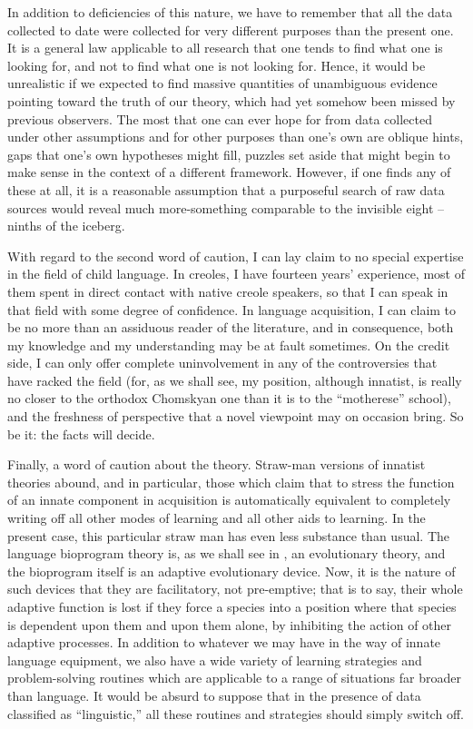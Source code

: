 In addition to deficiencies of this nature, we have to remember that all the data collected to date were collected for very different purposes than the present one. It is a general law applicable to all research that one tends to find what one is looking for, and not to find what one is not looking for. Hence, it would be unrealistic if we expected to find massive quantities of unambiguous evidence pointing toward the truth of our theory, which had yet somehow been missed by previous observers. The most that one can ever hope for from data collected under other assumptions and for other purposes than one's own are oblique hints, gaps that one's own hypotheses might fill, puzzles set aside that might begin to make sense in the context of a different framework. However, if one finds any of these at all, it is a reasonable assumption that a purposeful search of raw data sources would reveal much more-something comparable to the invisible eight -- ninths of the iceberg.

With regard to the second word of caution, I can lay claim to no special expertise in the field of child language. In creoles, I have fourteen years' experience, most of them spent in direct contact with native creole speakers, so that I can speak in that field with some degree of confidence. In language acquisition, I can claim to be no more than an assiduous reader of the literature, and in consequence, both my knowledge and my understanding may be at fault sometimes. On the credit side, I can only offer complete uninvolvement in any of the controversies that have racked the field (for, as we shall see, my position, although innatist, is really no closer to the orthodox Chomskyan one than it is to the ``motherese'' school), and the freshness of perspective that a novel viewpoint may on occasion bring. So be it: the facts will decide.

Finally, a word of caution about the theory. Straw-man versions
of innatist theories abound, and in particular, those which claim that to stress the function of an innate component in acquisition is automatically equivalent to completely writing off all other modes of learning and all other aids to learning. In the present case, this particular straw man has even less substance than usual. The language bioprogram theory is, as we shall see in , an evolutionary theory, and the bioprogram itself is an adaptive evolutionary device. Now, it is the nature of such devices that they are facilitatory, not pre-emptive; that is to say, their whole adaptive function is lost if they force a species into a position where that species is dependent upon them and upon them alone, by inhibiting the action of other adaptive processes. In addition to whatever we may have in the way of innate language equipment, we also have a wide variety of learning strategies and problem-solving routines which are applicable to a range of situations far broader than language. It would be absurd to suppose that in the presence of data classified as ``linguistic,'' all these routines and strategies should simply switch off.

